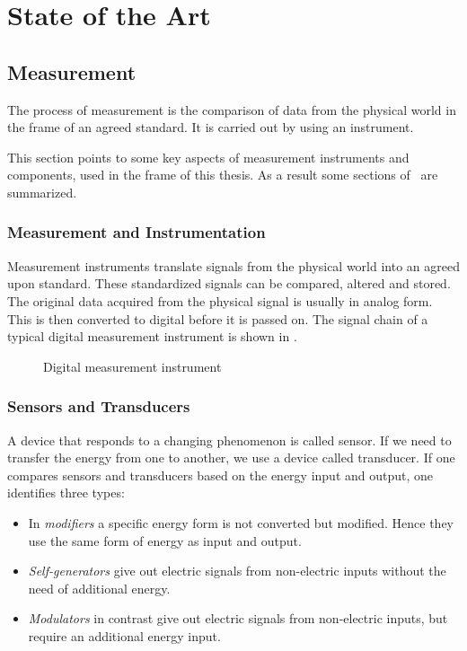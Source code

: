 \chapter{State of the Art%
  \label{chap:\currfilebase}}

\section{Measurement}
The process of measurement is the comparison of data from the physical world in the frame of an agreed standard. It is carried out by using an instrument.

This section points to some key aspects of measurement instruments and components, used in the frame of this thesis. As a result some sections of~\cite{webster2018measurement} are summarized.

\subsection{Measurement and Instrumentation}
Measurement instruments translate signals from the physical world into an agreed upon standard. These standardized signals can be compared, altered and stored.
The original data acquired from the physical signal is usually in analog form. This is then converted to digital before it is passed on. The signal chain of a typical digital measurement instrument is shown in .

\begin{figure}[!htb]
  \centering
  
  \caption[Digital instrument]{Digital measurement instrument%
    \label{fig:digital_instrument}}
\end{figure}

\subsection{Sensors and Transducers}
A device that responds to a changing phenomenon is called sensor. If we need to transfer the energy from one to another, we use a device called transducer. If one compares sensors and transducers based on the energy input and output, one identifies three types:
\begin{itemize}
  \item In \emph{modifiers} a specific energy form is not converted but modified. Hence they use the same form of energy as input and output.
  \item \emph{Self-generators} give out electric signals from non-electric inputs without the need of additional energy.
  \item \emph{Modulators} in contrast give out electric signals from non-electric inputs, but require an additional energy input.
\end{itemize}

